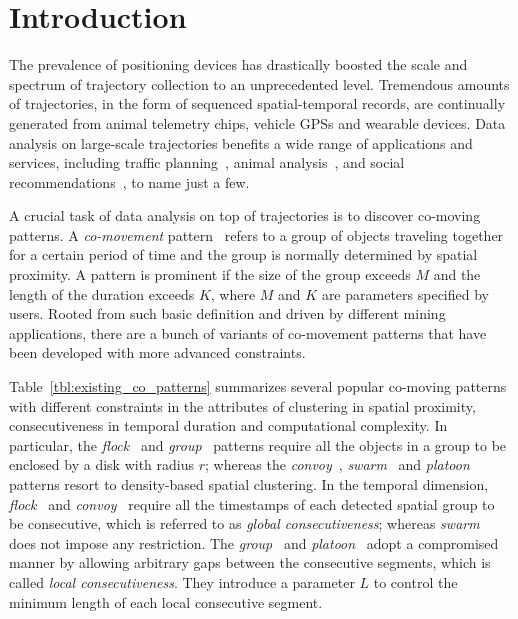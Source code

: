 

\section{Introduction}
The prevalence of positioning devices has drastically boosted 
the scale and spectrum of trajectory collection to an unprecedented level. 
Tremendous amounts of trajectories, in the form of sequenced spatial-temporal 
records, are continually generated from animal telemetry chips, 
vehicle GPSs and wearable devices. Data analysis on large-scale 
trajectories benefits a wide range of applications and services, 
including traffic planning~\cite{zheng2011urban}, animal analysis~\cite{li2010miningperiodic}, and social recommendations~\cite{bao2013survey}, to name just a few.


A crucial task of data analysis on top of trajectories is 
to discover co-moving patterns. A \emph{co-movement} pattern~\cite{li2013managing} 
refers to a group of objects traveling together for a certain period of time 
and the group is normally determined by spatial proximity. 
A pattern is prominent if the size of the group exceeds $M$ and the length of the duration exceeds $K$, where $M$ and $K$ are parameters specified by users. Rooted from such basic definition 
and driven by different mining applications, there are a bunch of variants 
of co-movement patterns that have been developed with more advanced constraints.

Table~\ref{tbl:existing_co_patterns} summarizes several popular co-moving patterns 
with different constraints in the attributes of clustering in spatial proximity,
consecutiveness in temporal duration and computational complexity. 
In particular,  the \emph{flock}~\cite{gudmundsson2006flock} 
and \emph{group}~\cite{wang2006grouppattern} patterns require 
all the objects in a group to be enclosed by a disk with radius $r$; 
whereas the \emph{convoy}~\cite{jeung2008convoy}, \emph{swarm}~\cite{li2010swarm} 
and \emph{platoon}~\cite{li2015platoon} patterns resort to density-based 
spatial clustering. 
In the temporal dimension, \emph{flock}~\cite{gudmundsson2006flock} 
and \emph{convoy}~\cite{jeung2008convoy} require all the timestamps 
of each detected spatial group to be consecutive, which is referred to as \emph{global consecutiveness}; 
whereas \emph{swarm}~\cite{li2010swarm} does not impose any restriction. 
The \emph{group}~\cite{wang2006grouppattern} and \emph{platoon}~\cite{li2015platoon} adopt a compromised manner by allowing
arbitrary gaps between the consecutive segments, which is called \emph{local consecutiveness}. 
They introduce a parameter $L$ to control the minimum length of each local consecutive segment.


